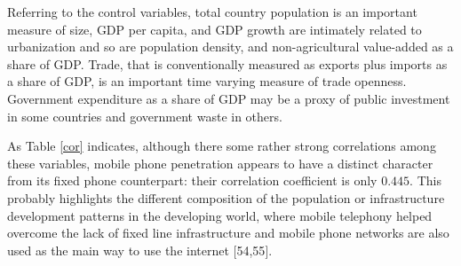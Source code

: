 \documentclass[10pt,letterpaper]{article}
\begin{document}
Referring to the control variables, total country population is an
important measure of size, GDP per capita, and GDP growth are intimately
related to urbanization and so are population density, and
non-agricultural value-added as a share of GDP. Trade, that is
conventionally measured as exports plus imports as a share of GDP, is an
important time varying measure of trade openness. Government expenditure
as a share of GDP may be a proxy of public investment in some countries
and government waste in others.

As Table \ref{cor} indicates, although there some rather strong
correlations among these variables, mobile phone penetration appears to
have a distinct character from its fixed phone counterpart: their
correlation coefficient is only \(0.445\). This probably highlights the
different composition of the population or infrastructure development
patterns in the developing world, where mobile telephony helped overcome
the lack of fixed line infrastructure and mobile phone networks are also
used as the main way to use the internet {[}54,55{]}.
\end{document}

